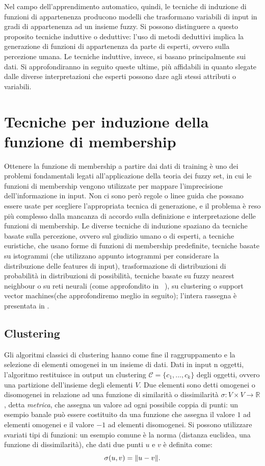 \documentclass[oneside, openany]{book}
\DeclarePairedDelimiter{\norma}{\lVert}{\rVert}
\begin{document}
		Nel campo dell'apprendimento automatico, quindi, le tecniche di induzione di funzioni di appartenenza producono modelli che trasformano variabili di input in gradi di appartenenza ad un insieme fuzzy. Si possono distinguere a questo proposito tecniche induttive o deduttive: l'uso di metodi deduttivi implica la generazione di funzioni di appartenenza da parte di esperti, ovvero sulla percezione umana. Le tecniche induttive, invece, si basano principalmente sui dati. Si approfondiranno in seguito queste ultime, più affidabili in quanto slegate dalle diverse interpretazioni che esperti possono dare agli stessi attributi o variabili.
		\newpage
	
		\chapter{Tecniche per induzione della funzione di membership}
		Ottenere la funzione di membership a partire dai dati di training è uno dei problemi fondamentali legati all'applicazione della teoria dei fuzzy set, in cui le funzioni di membership vengono utilizzate per mappare l'imprecisione dell'informazione in input. Non ci sono però regole o linee guida che possano essere usate per scegliere l'appropriata tecnica di generazione, e il problema è reso più complesso dalla mancanza di accordo sulla definizione e interpretazione delle funzioni di membership. Le diverse tecniche di induzione spaziano da tecniche basate sulla percezione, ovvero sul giudizio umano o di esperti, a tecniche euristiche, che usano forme di funzioni di membership predefinite, tecniche basate su istogrammi (che utilizzano appunto istogrammi per considerare la distribuzione delle features di input), trasformazione di distribuzioni di probabilità in distribuzioni di possibilità, tecniche basate su fuzzy nearest neighbour o su reti neurali (come approfondito in ~\cite{bib:rita}), su clustering o support vector machines(che approfondiremo meglio in seguito); l'intera rassegna è presentata in \cite{bib:rassegna}.
		
		\section{Clustering}
		Gli algoritmi classici di clustering hanno come fine il raggruppamento e la selezione di elementi omogenei in un insieme di dati. Dati in input n oggetti, l'algoritmo restituisce in output un clustering $\mathcal{C}=\{c_1, ..., c_k\}$ degli oggetti, ovvero una partizione dell'insieme degli elementi $V$. Due elementi sono detti omogenei o disomogenei in relazione ad una funzione di similarità o dissimilarità $\sigma: V\times V\rightarrow \mathbb{R}$, detta \textit{metrica}, che assegna un valore ad ogni possibile coppia di punti: un esempio banale può essere costituito da una funzione che assegna il valore $1$ ad elementi omogenei e il valore $-1$ ad elementi disomogenei. Si possono utilizzare svariati tipi di funzioni: un esempio comune è la norma (distanza euclidea, una funzione di dissimilarità), che dati due punti $u$ e $v$ è definita come:
		\[
			\sigma(u, v) = \norma{u - v}\text{.}
		\]
		
\end{document}
